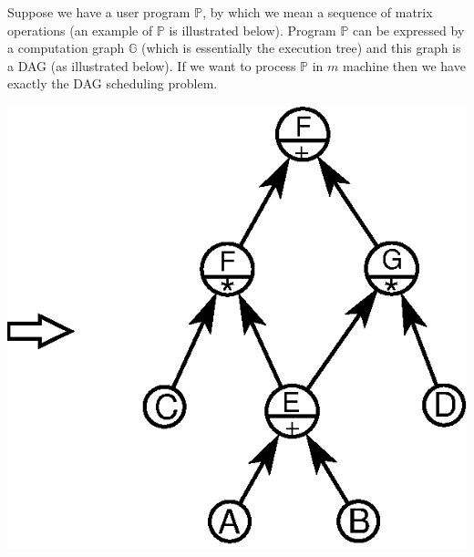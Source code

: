 \documentclass[10pt]{article}
\begin{document}
\medskip
{} Suppose we have a user program $\mathbb P$, by
which we mean a sequence of matrix operations (an example of $\mathbb P$ is
illustrated below). Program $\mathbb P$ can be expressed by a computation graph
$\mathbb G$ (which is essentially the execution tree) and this graph is a DAG
(as illustrated below). If we want to process $\mathbb P$ in $m$ machine then we
have exactly the DAG scheduling problem.


 
\vspace{15mm}\makebox[11mm]{} 

\vspace{-49mm}\makebox[55mm]{} \includegraphics[scale=0.9]{executiong.eps}
\end{document}
